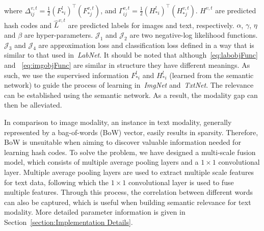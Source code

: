 \documentclass[10pt,twocolumn,letterpaper]{article}
\begin{document}
where ${\Delta }_{ij}^{v,t}=\frac{1}{2}({F_{\ast i}^{l}})^{\top}({F_{\ast j}^{v,t}})$, and ${\Gamma }_{ij}^{ v,t}=\frac{1}{2} ({H_{\ast i}^{l}})^{\top} (H_{\ast j}^{v,t})$. $H^{v,t}$ are predicted hash codes and $\hat{L}^{v,t}$ are predicted labels for images and text, respectively. $\alpha$, $\gamma$, $\eta$ and $\beta$ are hyper-parameters. $\mathcal{J}_{1}$ and $\mathcal{J}_{2}$ are two negative-log likelihood functions. $\mathcal{J}_{3}$ and $\mathcal{J}_{4}$ are approximation loss and classification loss defined in a way that is similar to that used in~\emph{LabNet}. It should be noted that although~\eqref{eq:labobjFunc} and ~\eqref{eq:imgobjFunc} are similar in structure they have different meanings. As such, we use the supervised information ${F_{\ast i}^{l}}$ and ${H_{\ast i}^{l}}$ (learned from the semantic network) to guide the process of learning in~\emph{ImgNet} and~\emph{TxtNet}. The relevance can be established using the semantic network. As a result, the modality gap can then be alleviated.

In comparison to image modality, an instance in text modality, generally represented by a bag-of-words (BoW) vector, easily results in sparsity. Therefore, BoW is unsuitable when aiming to discover valuable information needed for learning hash codes. To solve the problem, we have designed a multi-scale fusion model, which consists of multiple average pooling layers and a $1\times1$ convolutional layer. Multiple average pooling layers are used to extract multiple scale features for text data, following which the $1\times1$ convolutional layer is used to fuse multiple features. Through this process, the correlation between different words can also be captured, which is useful when building semantic relevance for text modality. More detailed parameter information is given in Section~\ref{section:Implementation Details}.
\vspace{-0.2cm}
\end{document}
